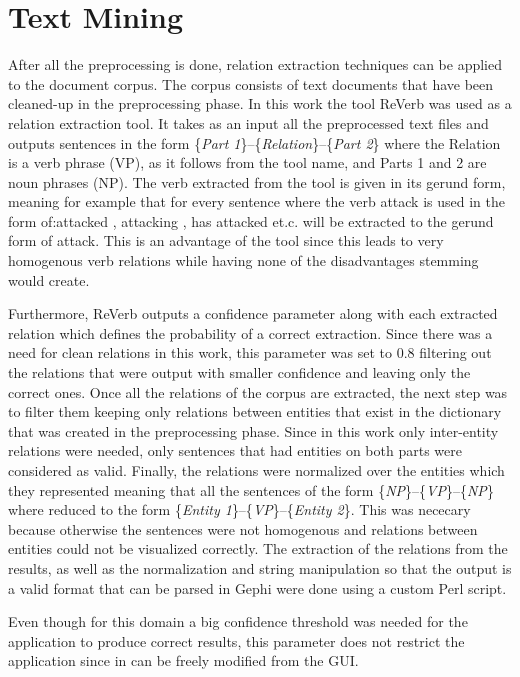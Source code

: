 \documentclass[]{article}
\begin{document}
\section{Text Mining}
%
After all the preprocessing is done, relation extraction techniques can be applied to the document corpus. The corpus consists of text documents that have been cleaned-up in the preprocessing phase. In this work the tool ReVerb was used as a relation extraction tool. It takes as an input all the preprocessed text files and outputs sentences in the form \{\textit{Part 1}\}--\{\textit{Relation}\}--\{\textit{Part 2}\} where the Relation is a verb phrase (VP), as it follows from the tool name, and Parts 1 and 2 are noun phrases (NP).  The verb extracted from the tool is given in its gerund form, meaning for example that for every sentence where the verb attack is used in the form of:attacked , attacking , has attacked et.c. will be extracted to the gerund form of attack. This is an advantage of the tool since this leads to very homogenous verb relations while having none of the disadvantages stemming would create. 

Furthermore, ReVerb outputs a confidence parameter along with each extracted relation which defines the probability of a correct extraction. Since there was a need for clean relations in this work, this parameter was set to 0.8 filtering out the relations that were output with smaller confidence and leaving only the correct ones. Once all the relations of the corpus are extracted, the next step was to filter them keeping only relations between entities that exist in the dictionary that was created in the preprocessing phase. Since in this work only inter-entity relations were needed, only sentences that had entities on both parts were considered as valid. Finally, the relations were normalized over the entities which they represented meaning that all the sentences of the form \{\textit{NP}\}--\{\textit{VP}\}--\{\textit{NP}\} where reduced to the form \{\textit{Entity 1}\}--\{\textit{VP}\}--\{\textit{Entity 2}\}. This was nececary because otherwise the sentences were not homogenous and relations between entities could not be visualized correctly. The extraction of the relations from the results, as well as the normalization and string manipulation so that the output is a valid format that can be parsed in Gephi were done using a custom Perl script.

Even though for this domain a big confidence threshold was needed for the application to produce correct results, this parameter does not restrict the application since in can be freely modified from the GUI.
\end{document}
